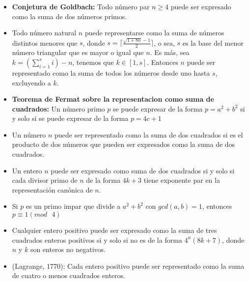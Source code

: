 \begin{itemize}
	\item{\textbf{Conjetura de Goldbach:}
		 Todo n\'umero par $n \geq 4$ puede ser expresado como la suma de dos n\'umeros primos.
	}
	\item{
		Todo n\'umero natural $n$ puede representarse como la suma de n\'umeros distintos menores que $s$, 
		donde $s = \lceil \frac{\sqrt{1 + 8n} - 1}{2} \rceil$, o sea, $s$ es la base del menor n\'umero triangular 
		que es mayor o igual que $n$. Es m\'as, sea $k = (\sum_{i=1}^s i) - n$, tenemos que $k \in [1, s]$. 
		Entonces $n$ puede ser representado como la suma de todos los n\'umeros desde uno hasta $s$, excluyendo a $k$.
		
	}
	\item{\textbf{Teorema de Fermat sobre la representacion como suma de cuadrados:}
		Un n\'umero primo $p$ se puede expresar de la forma $p=a^2 + b^2$ si y solo si se puede expresar 
		de la forma $p = 4c + 1$
	}
	\item{
		Un n\'umero $n$ puede ser representado como la suma de dos cuadrados si
	    es el producto de dos n\'umeros que pueden ser expresados como la suma de dos cuadrados.
	}
	\item{
		Un entero $n$ puede ser expresado como suma de dos cuadrados si y solo si cada divisor primo de 
		$n$ de la forma $4k+3$ tiene exponente par en la representaci\'on can\'onica de $n$.
	}
	\item{
	    Si $p$  es un primo impar que divide a $a^2 + b^2$ con $gcd(a, b) = 1$, entonces $p \equiv 1 (mod \text{ } 4)$
	}
	\item{
		Cualquier entero positivo puede ser expresado como la suma de tres cuadrados enteros positivos
		si y solo si no es de la forma $4^n(8k+7)$, donde $n$ y $k$ son enteros no negativos.
	}
	\item{
		(Lagrange, 1770): Cada entero positivo puede ser representado como la suma de cuatro o menos cuadrados 
		enteros.
	}
\end{itemize}

